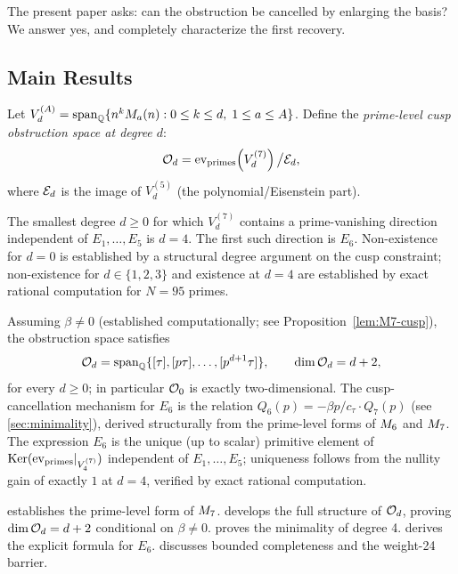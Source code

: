 \documentclass[11pt]{article}
\begin{document}
The present paper asks: can the obstruction be cancelled by enlarging the basis?
We answer yes, and completely characterize the first recovery.

\subsection{Main Results}

Let $V_d^{(A)} = \operatorname{span}_{\mathbb{Q}}\{n^kM_{a}(n) : 0\le k\le d,\; 1\le a\le A\}$.
Define the \emph{prime-level cusp obstruction space at degree $d$}:
\[
  \mathcal{O}_d = \mathrm{ev}_{\mathrm{primes}}\!\left(
            V_d^{(7)}\right) \big/ \mathcal{E}_d,
\]
where $\mathcal{E}_d$ is the image of $V_d^{(5)}$ (the polynomial/Eisenstein part).

\begin{theorem}
\label{thm:recovery}
The smallest degree $d\ge 0$ for which $V_d^{(7)}$ contains a prime-vanishing direction
independent of $E_1,\dots,E_5$ is $d=4$.
The first such direction is $E_6$.
Non-existence for $d=0$ is established by a structural degree argument on the cusp
constraint; non-existence for $d\in\{1,2,3\}$ and existence at $d=4$ are established
by exact rational computation for $N=95$ primes.
\end{theorem}

\begin{proposition}
\label{thm:structural}
Assuming $\beta\ne 0$ (established computationally; see Proposition~\ref{lem:M7-cusp}),
the obstruction space satisfies
\[
  \mathcal{O}_d = \operatorname{span}_{\mathbb{Q}}\{[\tau],[p\tau],\dots,[p^{d+1}\tau]\},
  \qquad \dim\mathcal{O}_d = d+2,
\]
for every $d\ge 0$; in particular $\mathcal{O}_0$ is exactly two-dimensional.
The cusp-cancellation mechanism for $E_6$ is the relation
$Q_6(p) = -\beta p/c_\tau\cdot Q_7(p)$ (see \cref{sec:minimality}), derived
structurally from the prime-level forms of $M_{6}$ and $M_{7}$.
The expression $E_6$ is the unique (up to scalar) primitive element of
$\operatorname{Ker}(\mathrm{ev}_{\mathrm{primes}}|_{V_4^{(7)}})$ independent of $E_1,\dots,E_5$;
uniqueness follows from the nullity gain of exactly $1$ at $d=4$, verified by exact
rational computation.
\end{proposition}

 establishes the prime-level form of $M_{7}$.
 develops the full structure of $\mathcal{O}_d$, proving
$\dim\mathcal{O}_d=d+2$ conditional on $\beta\ne 0$.
 proves the minimality of degree 4.
 derives the explicit formula for $E_6$.
 discusses bounded completeness and the weight-24 barrier.
\end{document}

